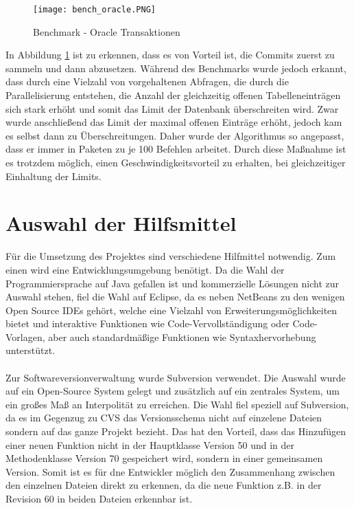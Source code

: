 \begin{figure}[H]
\centering
\texttt{[image: bench\_oracle.PNG]}
\caption{Benchmark - Oracle Transaktionen}
\label{fig:benchoracletransactions}
\end{figure}

In Abbildung \ref{fig:benchoracletransactions} ist zu erkennen, dass es von Vorteil ist, die Commits zuerst zu sammeln und dann abzusetzen.
Während des Benchmarks wurde jedoch erkannt, dass durch eine Vielzahl von vorgehaltenen Abfragen, die durch die Parallelisierung entstehen, die Anzahl der gleichzeitig offenen Tabelleneinträgen sich stark erhöht und somit das Limit der Datenbank überschreiten wird.
Zwar wurde anschließend das Limit der maximal offenen Einträge erhöht, jedoch kam es selbst dann zu Überschreitungen.
Daher wurde der Algorithmus so angepasst, dass er immer in Paketen zu je 100 Befehlen arbeitet.
Durch diese Maßnahme ist es trotzdem möglich, einen Geschwindigkeitsvorteil zu erhalten, bei gleichzeitiger Einhaltung der Limits.

\section{Auswahl der Hilfsmittel}
\label{sec:hilfsmittelwahl}

Für die Umsetzung des Projektes sind verschiedene Hilfmittel notwendig.
Zum einen wird eine Entwicklungsumgebung benötigt.
Da die Wahl der Programmiersprache auf Java gefallen ist und kommerzielle Lösungen nicht zur Auswahl stehen, fiel die Wahl auf Eclipse, da es neben NetBeans zu den wenigen Open Source IDEs gehört, welche eine Vielzahl von Erweiterungsmöglichkeiten bietet und interaktive Funktionen wie Code-Vervollständigung oder Code-Vorlagen, aber auch standardmäßige Funktionen wie Syntaxhervorhebung unterstützt.\\\\
Zur Softwareversionverwaltung wurde Subversion verwendet.
Die Auswahl wurde auf ein Open-Source System gelegt und zusätzlich auf ein zentrales System, um ein großes Maß an Interpolität zu erreichen.
Die Wahl fiel speziell auf Subversion, da es im Gegenzug zu CVS das Versionsschema nicht auf einzelene Dateien sondern auf das ganze Projekt bezieht.
Das hat den Vorteil, dass das Hinzufügen einer neuen Funktion nicht in der Hauptklasse Version 50 und in der Methodenklasse Version 70 gespeichert wird, sondern in einer gemeinsamen Version.
Somit ist es für dne Entwickler möglich den Zusammenhang zwischen den einzelnen Dateien direkt zu erkennen, da die neue Funktion z.B. in der Revision 60 in beiden Dateien erkennbar ist.\\

